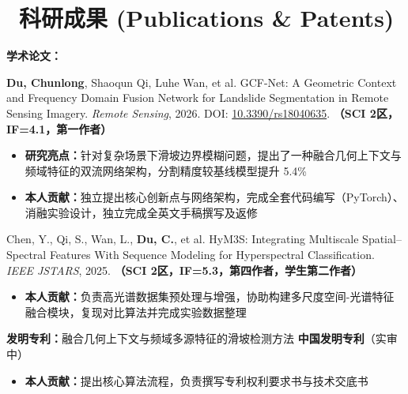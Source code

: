 \documentclass[9pt]{article}
\newlength{\interProjectSpacing}
\newcommand{\projectsep}{\vspace{\interProjectSpacing}}
\begin{document}
\section{\makebox[\widthof{\faFileText}][c]{\color{CVBlue}\faFileText}\ 科研成果 (Publications \& Patents)}

\textbf{学术论文：}
\begin{enumerate}[label={[\arabic*]}, leftmargin=1.5em]
    \item \textbf{Du, Chunlong}, Shaoqun Qi, Luhe Wan, et al. GCF-Net: A Geometric Context and Frequency Domain Fusion Network for Landslide Segmentation in Remote Sensing Imagery. \textit{Remote Sensing}, 2026. DOI: \href{https://doi.org/10.3390/rs18040635}{10.3390/rs18040635}. \textbf{\color{CVBlue}（SCI 2区，IF=4.1，第一作者）}
    \begin{itemize}[label=\faAngleRight, leftmargin=1em, topsep=0.1em]
        \item \textbf{研究亮点：}针对复杂场景下滑坡边界模糊问题，提出了一种融合几何上下文与频域特征的双流网络架构，分割精度较基线模型提升 5.4\%
        \item \textbf{本人贡献：}独立提出核心创新点与网络架构，完成全套代码编写（PyTorch）、消融实验设计，独立完成全英文手稿撰写及返修
    \end{itemize}
    \vspace{0.2em}
    \item Chen, Y., Qi, S., Wan, L., \textbf{Du, C.}, et al. HyM3S: Integrating Multiscale Spatial--Spectral Features With Sequence Modeling for Hyperspectral Classification. \textit{IEEE JSTARS}, 2025. \textbf{\color{CVBlue}（SCI 2区，IF=5.3，第四作者，学生第二作者）}
    \begin{itemize}[label=\faAngleRight, leftmargin=1em, topsep=0.1em]
        \item \textbf{本人贡献：}负责高光谱数据集预处理与增强，协助构建多尺度空间-光谱特征融合模块，复现对比算法并完成实验数据整理
    \end{itemize}
\end{enumerate}

\projectsep
\textbf{发明专利：}融合几何上下文与频域多源特征的滑坡检测方法 \textbf{中国发明专利}（实审中）
\begin{itemize}[label=\faAngleRight, leftmargin=1.5em, topsep=0.1em]
    \item \textbf{本人贡献：}提出核心算法流程，负责撰写专利权利要求书与技术交底书
\end{itemize}
\end{document}
